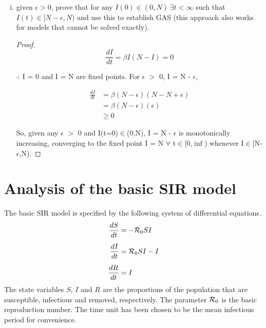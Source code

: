 \documentclass[12pt]{article}
\begin{document}
\begin{enumerate}[(a)]
\begin{enumerate}[(i)]
{\begin{proof}
{	This is the exact solution of ~\eqref{E:SI}. Taking the limit as $t \rightarrow \infty$ and using L'Hôpital's rule gives

	\begin{align}
		\lim_{t\to\infty} \frac{NI_0e^{\beta Nt}}{N+I_0(e^{\beta Nt} -1)} &= \lim_{t\to\infty} \frac{N^{\cancel 2} \cancel{\beta I_0e^{\beta Nt}}}{\cancel{N \beta I_0e^{\beta Nt}} } \\
													    &= N
	\end{align}
}
\end{proof}
}

\item given $\epsilon>0$, prove that for any $I(0)\in(0,N)\ \exists t<\infty$ such that $I(t)\in[N-\epsilon,N)$ and use this to establish GAS (this approach also works for models that cannot be solved exactly).

{\color{blue}
\begin{proof}
{\color{magenta}
	
	\begin{equation}
\frac{dI}{dt} = \beta I(N-I) = 0 
\end{equation}

$\therefore$ I = 0 and I = N are fixed points. For $\epsilon$ $>$ 0, I = N - $\epsilon$,

\begin{align}
\frac{dI}{dt} &= \beta (N-\epsilon)(N-N+\epsilon) \\
&= \beta (N-\epsilon)(\epsilon) \\
&\geq 0
\end{align}

So, given any $\epsilon$ $>$ 0 and I(t=0)$\in$(0,N), I = N - $\epsilon$ is monotonically increasing, converging to the fixed point I = N $\forall$ t$\in$[0,$\inf$) whenever I$\in$[N-$\epsilon$,N).
}
\end{proof}
}

\end{enumerate}
\end{enumerate}

\section{Analysis of the basic SIR  model}

The basic SIR model is specified by the following system of differential equations.
\begin{subequations}
\begin{align}
\frac{dS}{dt} &= -\R_0 SI \\
\noalign{\vspace{5pt}}
\frac{dI}{dt} &= \R_0 SI - I \\
\noalign{\vspace{5pt}}
\frac{dR}{dt} &= I
\end{align}
\end{subequations}
The state variables $S$, $I$ and $R$ are the proportions of the population that are susceptible, infectious and removed, respectively.  The parameter ${\cal R}_0$ is the basic reproduction number.  The time unit has been chosen to be the mean infectious period for convenience.
\end{document}
